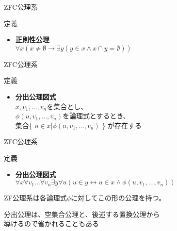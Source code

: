 \documentclass[17pt,aspectratio=169,xcolor=dvipsnames,table,dvipdfmx]{beamer}
\theoremstyle{definition}
\begin{document}
\begin{frame}{ZFC公理系}
    \begin{block}{定義}
        \begin{itemize}
            \item \textbf{正則性公理} \\
                  $\forall x (x \neq \emptyset \rightarrow \exists y (y \in x \land x \cap y = \emptyset))$
        \end{itemize}
    \end{block}
\end{frame}

\begin{frame}{ZFC公理系}
    \begin{block}{定義}
        \begin{itemize}
            \item \textbf{分出公理図式} \\
                  $x, v_1, \dots, v_n$を集合とし、\\
                  $\phi (u, v_1, \dots, v_n)$を論理式とするとき、\\
                  集合\{ $u \in x | \phi(u, v_1, \dots, v_n)$ \} が存在する
        \end{itemize}
    \end{block}

\end{frame}

\begin{frame}{ZFC公理系}
    \begin{block}{定義}
        \begin{itemize}
            \item \textbf{分出公理図式} \\
                  $\forall x \forall v_1 \dots \forall v_n \exists y \forall u (u \in y \leftrightarrow u \in x \land \phi(u, v_1, \dots, v_n))$
        \end{itemize}
        ZF公理系は各論理式$\phi$に対してこの形の公理を持つ。
    \end{block}

    分出公理は、空集合公理と、後述する置換公理から\\
    導けるので省かれることもある
\end{frame}
\end{document}
